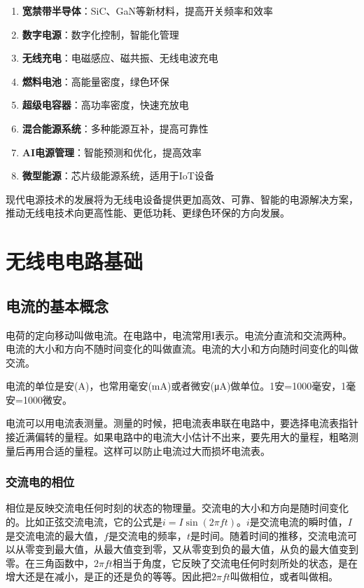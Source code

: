 \documentclass[12pt,UTF8]{ctexbook}
\begin{document}
\begin{enumerate}
    \item \textbf{宽禁带半导体}：SiC、GaN等新材料，提高开关频率和效率
    \item \textbf{数字电源}：数字化控制，智能化管理
    \item \textbf{无线充电}：电磁感应、磁共振、无线电波充电
    \item \textbf{燃料电池}：高能量密度，绿色环保
    \item \textbf{超级电容器}：高功率密度，快速充放电
    \item \textbf{混合能源系统}：多种能源互补，提高可靠性
    \item \textbf{AI电源管理}：智能预测和优化，提高效率
    \item \textbf{微型能源}：芯片级能源系统，适用于IoT设备
\end{enumerate}

现代电源技术的发展将为无线电设备提供更加高效、可靠、智能的电源解决方案，推动无线电技术向更高性能、更低功耗、更绿色环保的方向发展。

\chapter{无线电电路基础}

\section{电流的基本概念}

电荷的定向移动叫做电流。在电路中，电流常用I表示。电流分直流和交流两种。电流的大小和方向不随时间变化的叫做直流。电流的大小和方向随时间变化的叫做交流。

电流的单位是安(A)，也常用毫安(mA)或者微安(μA)做单位。1安=1000毫安，1毫安=1000微安。

电流可以用电流表测量。测量的时候，把电流表串联在电路中，要选择电流表指针接近满偏转的量程。如果电路中的电流大小估计不出来，要先用大的量程，粗略测量后再用合适的量程。这样可以防止电流过大而损坏电流表。

\subsection{交流电的相位}

相位是反映交流电任何时刻的状态的物理量。交流电的大小和方向是随时间变化的。比如正弦交流电流，它的公式是$i = I\sin(2\pi ft)$。$i$是交流电流的瞬时值，$I$是交流电流的最大值，$f$是交流电的频率，$t$是时间。随着时间的推移，交流电流可以从零变到最大值，从最大值变到零，又从零变到负的最大值，从负的最大值变到零。在三角函数中，$2\pi ft$相当于角度，它反映了交流电任何时刻所处的状态，是在增大还是在减小，是正的还是负的等等。因此把$2\pi ft$叫做相位，或者叫做相。
\end{document}
